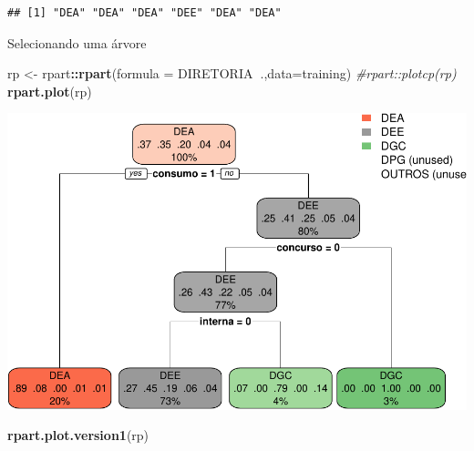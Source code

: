 \documentclass[]{article}
\newenvironment{Shaded}{\begin{snugshade}}{\end{snugshade}}
\newcommand{\KeywordTok}[1]{\textcolor[rgb]{0.13,0.29,0.53}{\textbf{#1}}}
\newcommand{\DataTypeTok}[1]{\textcolor[rgb]{0.13,0.29,0.53}{#1}}
\newcommand{\StringTok}[1]{\textcolor[rgb]{0.31,0.60,0.02}{#1}}
\newcommand{\CommentTok}[1]{\textcolor[rgb]{0.56,0.35,0.01}{\textit{#1}}}
\newcommand{\OperatorTok}[1]{\textcolor[rgb]{0.81,0.36,0.00}{\textbf{#1}}}
\newcommand{\NormalTok}[1]{#1}
\begin{document}
\begin{Shaded}
\end{Shaded}

\begin{verbatim}
## [1] "DEA" "DEA" "DEA" "DEE" "DEA" "DEA"
\end{verbatim}

Selecionando uma árvore

\begin{Shaded}
\begin{Highlighting}[]
\NormalTok{rp <-}\StringTok{ }\NormalTok{rpart}\OperatorTok{::}\KeywordTok{rpart}\NormalTok{(}\DataTypeTok{formula =}\NormalTok{ DIRETORIA}\OperatorTok{~}\NormalTok{.,}\DataTypeTok{data=}\NormalTok{training)}
\CommentTok{#rpart::plotcp(rp)}
\KeywordTok{rpart.plot}\NormalTok{(rp)}
\end{Highlighting}
\end{Shaded}

\includegraphics{markdown_v31_files/figure-latex/unnamed-chunk-84-1.pdf}

\begin{Shaded}
\begin{Highlighting}[]
\KeywordTok{rpart.plot.version1}\NormalTok{(rp)}
\end{Highlighting}
\end{Shaded}
\end{document}
